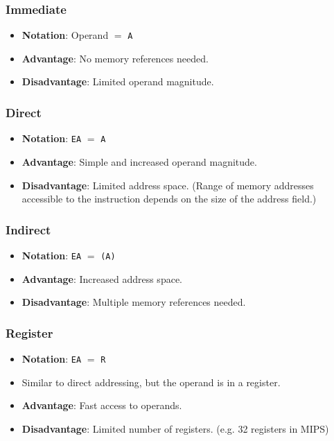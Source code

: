 \begin{multicols}{3}

\subsubsection{Immediate}

\begin{itemize}
    \item \textbf{Notation}: Operand $=$ \texttt{A}
    \item \textbf{Advantage}: No memory references needed.
    \item \raggedright\textbf{Disadvantage}: Limited operand magnitude.
\end{itemize}

\subsubsection{Direct}

\begin{itemize}
    \item \textbf{Notation}: \texttt{EA} $=$ \texttt{A}
    \item \textbf{Advantage}: Simple and increased operand magnitude.
    \item \textbf{Disadvantage}: Limited address space. (Range of memory addresses
        accessible to the instruction depends on the size of the address field.)
\end{itemize}

\columnbreak

\subsubsection{Indirect}

\begin{itemize}
    \item \textbf{Notation}: \texttt{EA} $=$ \texttt{(A)}
    \item \textbf{Advantage}: Increased address space.
    \item \textbf{Disadvantage}: Multiple memory references needed.
\end{itemize}

\subsubsection{Register}

\begin{itemize}
    \item \textbf{Notation}: \texttt{EA} $=$ \texttt{R}
    \item Similar to direct addressing, but the operand is in a register.
    \item \textbf{Advantage}: Fast access to operands.
    \item \textbf{Disadvantage}: Limited number of registers. (e.g. 32 registers in MIPS)
\end{itemize}


\end{multicols}
